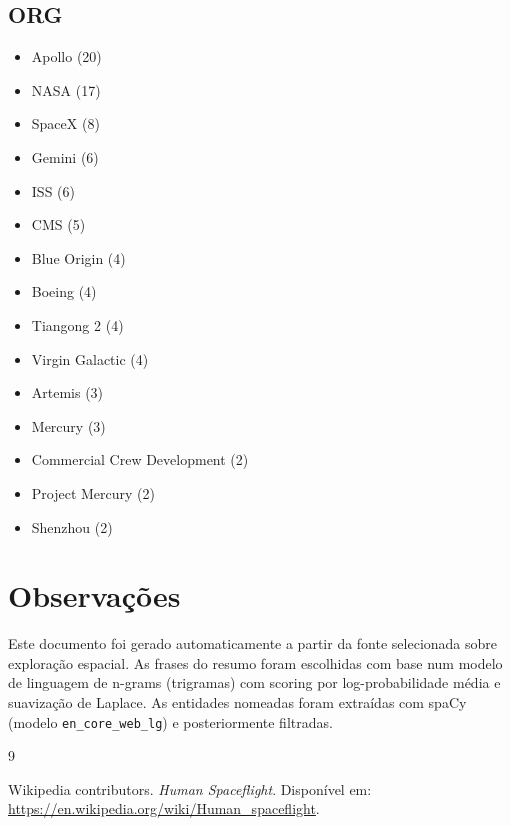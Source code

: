 \documentclass[12pt]{article}
\begin{document}
\subsection*{ORG}
\begin{itemize}
\item Apollo (20)
\item NASA (17)
\item SpaceX (8)
\item Gemini (6)
\item ISS (6)
\item CMS (5)
\item Blue Origin (4)
\item Boeing (4)
\item Tiangong 2 (4)
\item Virgin Galactic (4)
\item Artemis (3)
\item Mercury (3)
\item Commercial Crew Development (2)
\item Project Mercury (2)
\item Shenzhou (2)
\end{itemize}


\section{Observações}

Este documento foi gerado automaticamente a partir da fonte selecionada sobre exploração espacial.
As frases do resumo foram escolhidas com base num modelo de linguagem de n-grams (trigramas) com scoring por log-probabilidade média e suavização de Laplace.
As entidades nomeadas foram extraídas com spaCy (modelo \texttt{en\_core\_web\_lg}) e posteriormente filtradas.

\begin{thebibliography}{9}

Wikipedia contributors. \textit{Human Spaceflight}. Disponível em: \url{https://en.wikipedia.org/wiki/Human_spaceflight}.

\end{thebibliography}
\end{document}
